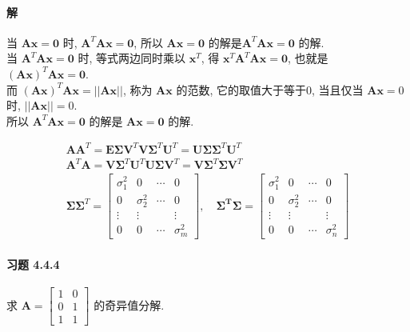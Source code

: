\documentclass[12pt, a4paper, oneside, fontset=none]{ctexart}
\begin{document}
\paragraph*{解} 当 $\bm{Ax} = \bm{0}$ 时, $\bm{A}^T\bm{Ax} = \bm{0}$, 所以 $\bm{Ax} = \bm{0}$ 的解是$\bm{A}^T\bm{Ax} = \bm{0}$ 的解.
\\ 当 $\bm{A}^T\bm{Ax} = \bm{0}$ 时, 等式两边同时乘以 $\bm{x}^T$, 得 $\bm{x}^T\bm{A}^T\bm{Ax} = \bm{0}$, 也就是 $(\bm{Ax})^T\bm{Ax} = \bm{0}$.
\\ 而 $(\bm{Ax})^T\bm{Ax} = ||\bm{Ax}||$, 称为 $\bm{Ax}$ 的范数, 它的取值大于等于0, 当且仅当 $\bm{Ax} = 0$ 时, $||\bm{Ax}|| = 0$.
\\ 所以 $\bm{A}^T\bm{Ax} = \bm{0}$ 的解是 $\bm{Ax} = \bm{0}$ 的解.

\begin{gather*}
    \bm{AA}^T = \bm{E\Sigma V}^T\bm{V\Sigma}^T\bm{U}^T = \bm{U\Sigma\Sigma}^T\bm{U}^T \\
    \bm{A}^T\bm{A} = \bm{V\Sigma}^T\bm{U}^T\bm{U\Sigma V}^T = \bm{V\Sigma}^T\bm{\Sigma V}^T \\
    \bm{\Sigma\Sigma}^T = \begin{bmatrix}
        \sigma_1^2 & 0          & \cdots & 0          \\
        0          & \sigma_2^2 & \cdots & 0          \\
        \vdots     & \vdots     &        & \vdots     \\
        0          & 0          & \cdots & \sigma_m^2
    \end{bmatrix}, \quad \bm{\Sigma^T}\bm{\Sigma}= \begin{bmatrix}
        \sigma_1^2 & 0          & \cdots & 0          \\
        0          & \sigma_2^2 & \cdots & 0          \\
        \vdots     & \vdots     &        & \vdots     \\
        0          & 0          & \cdots & \sigma_n^2
    \end{bmatrix}
\end{gather*}

\paragraph*{习题 4.4.4} 求 $\bm{A} = \begin{bmatrix}
        1 & 0 \\
        0 & 1 \\
        1 & 1
    \end{bmatrix}$ 的奇异值分解.
\end{document}
